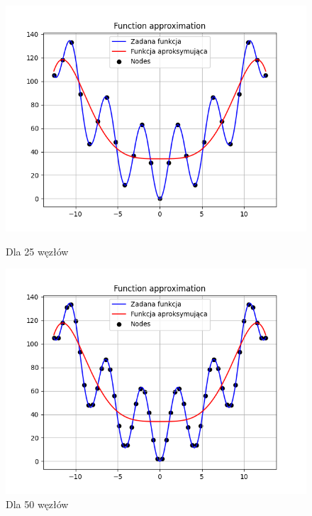 \documentclass{article}
\begin{document}
\begin{figure}[H]
  \begin{minipage}[b]{0.49\textwidth}
    \begin{minipage}[b]{\textwidth}
      \includegraphics[width=\textwidth]{img31.png}
      \caption{Dla 25 węzłów}
    \end{minipage}
    \vspace*{\fill}
    \begin{minipage}[b]{\textwidth}
      \includegraphics[width=\textwidth]{img32.png}
      \caption{Dla 50 węzłów}
    \end{minipage}
  \end{minipage}
  \hfill
  \begin{minipage}[b]{0.49\textwidth}

\end{minipage}
\end{figure}
\end{document}
